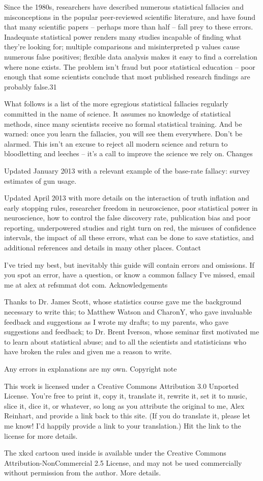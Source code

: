 Since the 1980s, researchers have described numerous statistical fallacies and misconceptions in the popular peer-reviewed scientific literature, and have found that many scientific papers – perhaps more than half – fall prey to these errors. Inadequate statistical power renders many studies incapable of finding what they’re looking for; multiple comparisons and misinterpreted p values cause numerous false positives; flexible data analysis makes it easy to find a correlation where none exists. The problem isn’t fraud but poor statistical education – poor enough that some scientists conclude that most published research findings are probably false.31

What follows is a list of the more egregious statistical fallacies regularly committed in the name of science. It assumes no knowledge of statistical methods, since many scientists receive no formal statistical training. And be warned: once you learn the fallacies, you will see them everywhere. Don’t be alarmed. This isn’t an excuse to reject all modern science and return to bloodletting and leeches – it’s a call to improve the science we rely on.
Changes

Updated January 2013 with a relevant example of the base-rate fallacy: survey estimates of gun usage.

Updated April 2013 with more details on the interaction of truth inflation and early stopping rules, researcher freedom in neuroscience, poor statistical power in neuroscience, how to control the false discovery rate, publication bias and poor reporting, underpowered studies and right turn on red, the misuses of confidence intervals, the impact of all these errors, what can be done to save statistics, and additional references and details in many other places.
Contact

I’ve tried my best, but inevitably this guide will contain errors and omissions. If you spot an error, have a question, or know a common fallacy I’ve missed, email me at alex at refsmmat dot com.
Acknowledgements

Thanks to Dr. James Scott, whose statistics course gave me the background necessary to write this; to Matthew Watson and CharonY, who gave invaluable feedback and suggestions as I wrote my drafts; to my parents, who gave suggestions and feedback; to Dr. Brent Iverson, whose seminar first motivated me to learn about statistical abuse; and to all the scientists and statisticians who have broken the rules and given me a reason to write.

Any errors in explanations are my own.
Copyright note

This work is licensed under a Creative Commons Attribution 3.0 Unported License. You’re free to print it, copy it, translate it, rewrite it, set it to music, slice it, dice it, or whatever, so long as you attribute the original to me, Alex Reinhart, and provide a link back to this site. (If you do translate it, please let me know! I’d happily provide a link to your translation.) Hit the link to the license for more details.

The xkcd cartoon used inside is available under the Creative Commons Attribution-NonCommercial 2.5 License, and may not be used commercially without permission from the author. More details.


